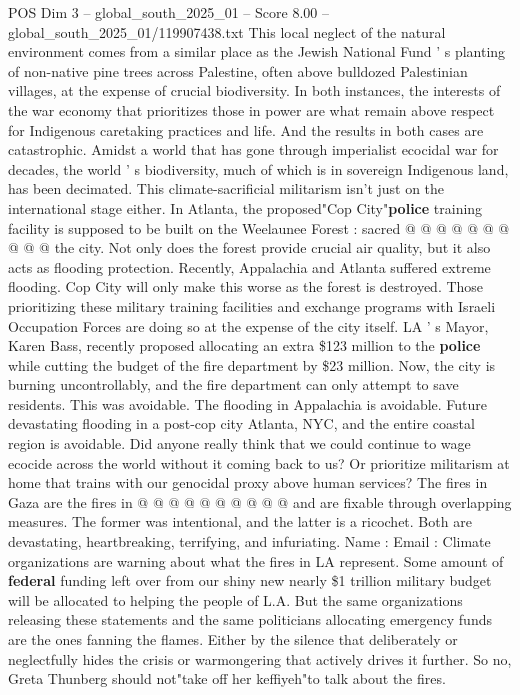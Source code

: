 \begin{textsample}{POS Dim 3 – global\_south\_2025\_01 – Score 8.00 – global\_south\_2025\_01/119907438.txt}
This local neglect of the natural environment comes from a similar place as the Jewish National Fund ' s planting of non-native pine trees across Palestine, often above bulldozed Palestinian villages, at the expense of crucial biodiversity.
In both instances, the interests of the war economy that prioritizes those in power are what remain above respect for Indigenous caretaking practices and life.
And the results in both cases are catastrophic.
Amidst a world that has gone through imperialist ecocidal war for decades, the world ' s biodiversity, much of which is in sovereign Indigenous land, has been decimated.
This climate-sacrificial militarism isn't just on the international stage either.
In Atlanta, the proposed"Cop City"\textbf{police} training facility is supposed to be built on the Weelaunee Forest : sacred @ @ @ @ @ @ @ @ @ @ the city.
Not only does the forest provide crucial air quality, but it also acts as flooding protection.
Recently, Appalachia and Atlanta suffered extreme flooding.
Cop City will only make this worse as the forest is destroyed.
Those prioritizing these military training facilities and exchange programs with Israeli Occupation Forces are doing so at the expense of the city itself.
LA ' s Mayor, Karen Bass, recently proposed allocating an extra \$123 million to the \textbf{police} while cutting the budget of the fire department by \$23 million.
Now, the city is burning uncontrollably, and the fire department can only attempt to save residents.
This was avoidable.
The flooding in Appalachia is avoidable.
Future devastating flooding in a post-cop city Atlanta, NYC, and the entire coastal region is avoidable.
Did anyone really think that we could continue to wage ecocide across the world without it coming back to us?
Or prioritize militarism at home that trains with our genocidal proxy above human services?
The fires in Gaza are the fires in @ @ @ @ @ @ @ @ @ @ and are fixable through overlapping measures.
The former was intentional, and the latter is a ricochet.
Both are devastating, heartbreaking, terrifying, and infuriating.
Name : Email : Climate organizations are warning about what the fires in LA represent.
Some amount of \textbf{federal} funding left over from our shiny new nearly \$1 trillion military budget will be allocated to helping the people of L.A.
But the same organizations releasing these statements and the same politicians allocating emergency funds are the ones fanning the flames.
Either by the silence that deliberately or neglectfully hides the crisis or warmongering that actively drives it further.
So no, Greta Thunberg should not"take off her keffiyeh"to talk about the fires.

\end{textsample}
